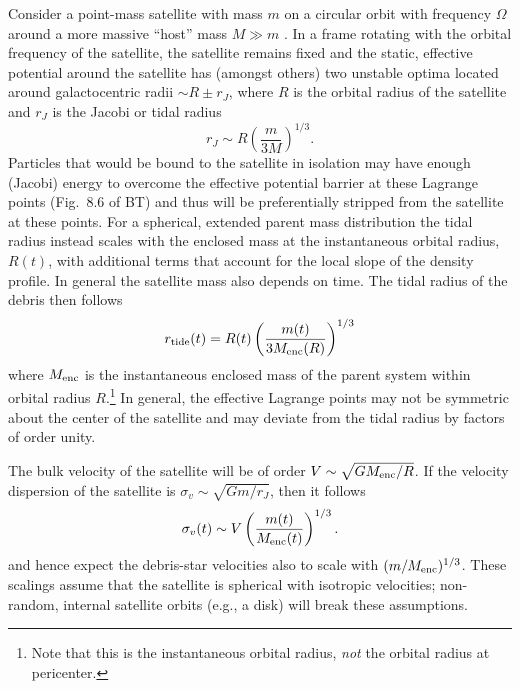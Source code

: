 \documentclass[letterpaper,12pt,preprint]{aastex}
\begin{document}
Consider a point-mass satellite with mass $m$ on a circular orbit with frequency $\Omega$ around a more massive ``host'' mass $M\gg m$ \citep[the ``restricted three-body problem''; e.g., \S 8.3][]{binneytremaine}. In a frame rotating with the orbital frequency of the satellite, the satellite remains fixed and the static, effective potential around the satellite has (amongst others) two unstable optima located around galactocentric radii $\sim R \pm r_J$, where $R$ is the orbital radius of the satellite and $r_J$ is the Jacobi or tidal radius
\begin{equation}
	r_J \sim R\left(\frac{m}{3M}\right)^{1/3}.\label{eq:ptmass}
\end{equation}
Particles that would be bound to the satellite in isolation may have enough (Jacobi) energy to overcome the effective potential barrier at these Lagrange points (Fig.~8.6 of BT) and thus will be preferentially stripped from the satellite at these points. For a spherical, extended parent mass distribution the tidal radius instead scales with the enclosed mass at the instantaneous orbital radius, $R(t)$, with additional terms that account for the local slope of the density profile. In general the satellite mass also depends on time. The tidal radius of the debris then follows
\begin{equation}
	r_{\rm tide}(t) = R(t)\left(\frac{m(t)}{3M_{\rm enc}(R)}\right)^{1/3}\label{eq:tidalradius}
\end{equation}
where $M_{\rm enc}$ is the instantaneous enclosed mass of the parent system within orbital radius $R$.\footnote{Note that this is the instantaneous orbital radius, \emph{not} the orbital radius at pericenter.}
In general, the effective Lagrange points may not be symmetric about the center of the satellite and may deviate from the tidal radius by factors of order unity. 

The bulk velocity of the satellite will be of order $V\sim \sqrt{GM_{\rm enc}/R}$. If the velocity dispersion of the satellite is $\sigma_v \sim \sqrt{Gm/r_J}$, then it follows
\begin{equation}
	\sigma_v(t) \sim V\left(\frac{m(t)}{M_{\rm enc}(t)}\right)^{1/3}\label{eq:velscale}.
\end{equation}
\citep[as pointed out in][]{binneytremaine} and hence expect the debris-star velocities also to scale with $(m/M_{\rm enc})^{1/3}$. These scalings assume that the satellite is spherical with isotropic velocities; non-random, internal satellite orbits (e.g., a disk) will break these assumptions. 
\end{document}
